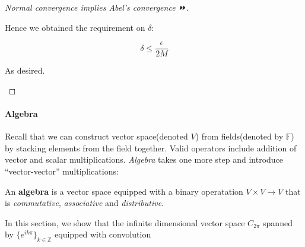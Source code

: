 \begin{proof}[Normal convergence implies Abel's convergence ⏩]
\begin{enumerate}
Hence we obtained the requirement on $\delta$:

\begin{equation}
\delta \leq \frac{\epsilon}{2M}
\end{equation}


As desired.
\end{enumerate}

\end{proof}\paragraph{Algebra}

Recall that we can construct vector space(denoted $V$) from fields(denoted by $\mathbb{F}$) by stacking elements from the field together. Valid operators include addition of vector and scalar multiplications. \textit{Algebra} takes one more step and introduce ``vector-vector'' multiplications:

\begin{definition}[Algebra]An \textbf{algebra} is a vector space equipped with a binary operatation $V\times V\to V$ that is \textit{commutative}, \textit{associative} and \textit{distributive}.

\end{definition}In this section, we show that the infinite dimensional vector space $C_{2\pi}$ spanned by $\{e^{ik\pi}\}_{k\in\mathbb{Z}}$ equipped with convolution
